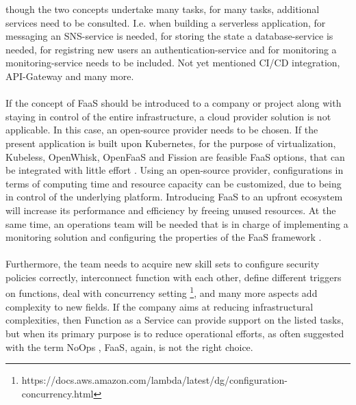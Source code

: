 \documentclass[a4paper,twoside,11pt, pagesize]{scrartcl}
\begin{document}
\begin{spacing}{1.2}
though the two concepts undertake many tasks, for many tasks, additional services need to be consulted. I.e. when building a serverless application, for messaging an SNS-service is needed, for storing the state a database-service is needed, for registring new users an authentication-service and for monitoring a monitoring-service needs to be included. Not yet mentioned CI/CD integration, API-Gateway and many more.\\\\ If the concept of FaaS should be introduced to a company or project along with staying in control of the entire infrastructure, a cloud provider solution is not applicable. In this case, an open-source provider needs to be chosen. If the present application is built upon Kubernetes, for the purpose of virtualization, Kubeless, OpenWhisk, OpenFaaS and Fission are feasible FaaS options, that can be integrated with little effort \cite{palade2019evaluation}. Using an open-source provider, configurations in terms of computing time and resource capacity can be customized, due to being in control of the underlying platform. Introducing FaaS to an upfront ecosystem will increase its performance and efficiency by freeing unused resources. At the same time, an operations team will be needed that is in charge of implementing a monitoring solution and configuring the properties of the FaaS framework \cite{mohanty2018evaluation}.\\\\ Furthermore, the team needs to acquire new skill sets to configure security policies correctly, interconnect function with each other, define different triggers on functions, deal with concurrency setting \footnote{https://docs.aws.amazon.com/lambda/latest/dg/configuration-concurrency.html}, and many more aspects add complexity to new fields. If the company aims at reducing infrastructural complexities, then Function as a Service can provide support on the listed tasks, but when its primary purpose is to reduce operational efforts, as often suggested with the term \glqq NoOps\grqq{} \cite{eivy2017wary}, FaaS, again, is not the right choice.

\end{spacing}
\end{document}
